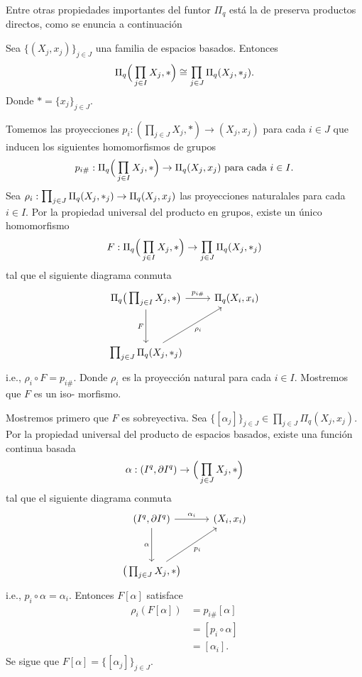 Entre otras propiedades importantes del funtor $\Pi_q$ está la de preserva productos directos, como se enuncia a continuación

\begin{prop}
    Sea $\{(X_j,x_j)\}_{j\in J}$ una familia de espacios basados. Entonces
    \[
    \Pi_q\Big(\medprod_{j\in I}X_j,*\Big)\cong 
    \medprod_{j\in J}\Pi_q(X_j,*_j).
    \]
    Donde $*=\{x_j\}_{j\in J}$.
\end{prop}
\begin{dem}
    Tomemos las proyecciones $p_i:(\prod_{j\in J}X_j,*)\to (X_j,x_j)$ para cada $i\in J$ que inducen los siguientes homomorfismos de grupos
    \begin{equation*}
        p_{i\#}: \Pi_q\Big(\medprod_{j\in I}X_j,*\Big)\to \Pi_q(X_j,x_j)\text{ para cada } i\in I.
    \end{equation*}
    Sea $\rho_i:\medprod_{j\in J}\Pi_q(X_j,*_j)\to \Pi_q(X_j,x_j)$ las proyecciones naturalales para cada $i\in I$. Por la propiedad universal del producto en grupos, existe un único homomorfismo 
    \[
    F:\Pi_q\Big(\medprod_{j\in I}X_j,*\Big)\to 
    \medprod_{j\in J}\Pi_q(X_j,*_j)
    \]
    tal que el siguiente diagrama conmuta
    \begin{equation*}
        \begin{tikzcd}[row sep= 1.2cm]
            \Pi_q\big(\medprod_{j\in I}X_j,*\big) \arrow[r,"p_{i\#}"] \arrow[d, "F"']& \Pi_q(X_i,x_i)\\
            \medprod_{j\in J}\Pi_q(X_j,*_j)\arrow[ur, "\rho_i"']
        \end{tikzcd}
    \end{equation*}
    i.e., $\rho_i\circ F=p_{i\#}$. Donde $\rho_i$ es la proyección natural para cada $i\in I$. Mostremos que $F$ es un iso- morfismo.

    Mostremos primero que $F$ es sobreyectiva. Sea $\{[\alpha_j]\}_{j\in J}\in \prod_{j\in J}\Pi_q(X_j,x_j)$. Por la propiedad universal del producto de espacios basados, existe una función continua basada 
    $$\alpha:(I^q,\partial I^q)\to \Big(\medprod_{j\in J}X_j,*\Big)$$ 
    tal que el siguiente diagrama conmuta
    \begin{equation*}
        \begin{tikzcd}[row sep= 1.2cm]
             (I^q,\partial I^q)\arrow[r,"\alpha_{i}"] \arrow[d, "\alpha"']& (X_i,x_i)\\
            \big(\prod_{j\in J}X_j,*\big)\arrow[ur, "p_i"']
        \end{tikzcd}
    \end{equation*}
    i.e., $p_i\circ\alpha=\alpha_i$. Entonces $F[\alpha]$ satisface 
    \begin{align*}
        \rho_i(F[\alpha])&=p_{i\#}[\alpha]\\
        &=[p_i\circ\alpha]\\
        &=[\alpha_i].
    \end{align*}
    Se sigue que $F[\alpha]=\{[\alpha_j]\}_{j\in J}$.


\end{dem}
